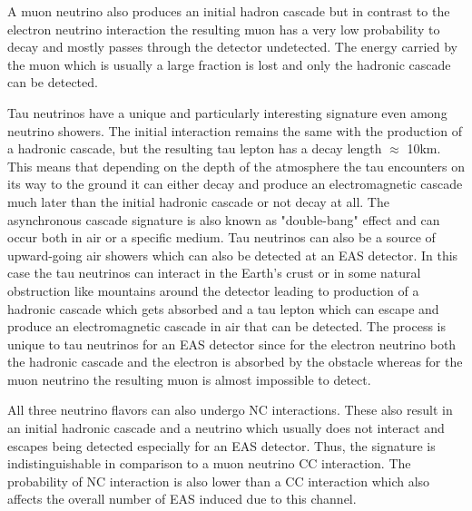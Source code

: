 A muon neutrino also produces an initial hadron cascade but in contrast to the electron neutrino interaction the resulting muon has a very low probability to decay and mostly passes through the detector undetected. The energy carried by the muon which is usually a large fraction is lost and only the hadronic cascade can be detected.

Tau neutrinos have a unique and particularly interesting signature even among neutrino showers. The initial interaction remains the same with the production of a hadronic cascade, but the resulting tau lepton has a decay length $\approx$ 10km. This means that depending on the depth of the atmosphere the tau encounters on its way to the ground it can either decay and produce an electromagnetic cascade much later than the initial hadronic cascade or not decay at all. The asynchronous cascade signature is also known as "double-bang" effect and can occur both in air or a specific medium. Tau neutrinos can also be a source of upward-going air showers which can also be detected at an EAS detector. In this case the tau neutrinos can interact in the Earth's crust or in some natural obstruction like mountains around the detector leading to production of a hadronic cascade which gets absorbed and a tau lepton which can escape and produce an electromagnetic cascade in air that can be detected. The process is unique to tau neutrinos for an EAS detector since for the electron neutrino both the hadronic cascade and the electron is absorbed by the obstacle whereas for the muon neutrino the resulting muon is almost impossible to detect.  

All three neutrino flavors can also undergo NC interactions. These also result in an initial hadronic cascade and a neutrino which usually does not interact and escapes being detected especially for an EAS detector. Thus, the signature is indistinguishable in comparison to a muon neutrino CC interaction. The probability of NC interaction is also lower than a CC interaction which also affects the overall number of EAS induced due to this channel.

